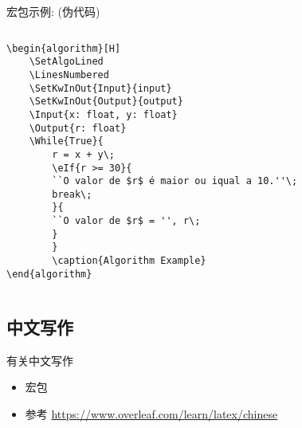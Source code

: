 \begin{frame}[fragile]{宏包示例:  (伪代码)}
	\begin{columns}
		\begin{column}{.6\textwidth}
			\lstset{language=[LaTeX]TeX}
			\begin{lstlisting}[basicstyle=\ttfamily\footnotesize]
\begin{algorithm}[H]
    \SetAlgoLined
    \LinesNumbered
    \SetKwInOut{Input}{input}
    \SetKwInOut{Output}{output}
    \Input{x: float, y: float}
    \Output{r: float}
    \While{True}{
        r = x + y\;
        \eIf{r >= 30}{
        ``O valor de $r$ é maior ou iqual a 10.''\;
        break\;
        }{
        ``O valor de $r$ = '', r\;
        }
        } 
        \caption{Algorithm Example}
\end{algorithm}\end{lstlisting}
		\end{column}
		\begin{column}{.4\textwidth}
			\begin{algorithm}[H]
				\SetAlgoLined
				\LinesNumbered
				\caption{Algorithm Example}
			\end{algorithm}
		\end{column}
	\end{columns}
\end{frame}

\subsection{中文写作}
\begin{frame}{有关中文写作}
	\begin{itemize}
		\item 宏包 
		\item 参考 \url{https://www.overleaf.com/learn/latex/chinese}
	\end{itemize}
\end{frame}

